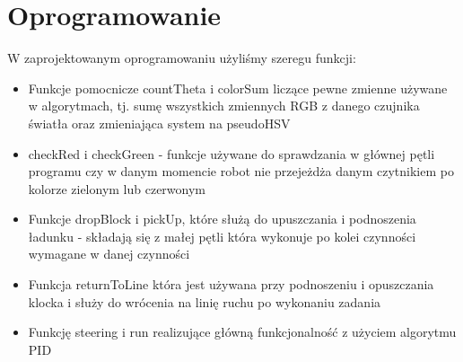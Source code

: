 \documentclass[10pt,a4paper]{report}
\begin{document}
\section{Oprogramowanie}
W zaprojektowanym oprogramowaniu użyliśmy szeregu funkcji:
\begin{itemize}
\item
 Funkcje pomocnicze countTheta i colorSum liczące pewne zmienne używane w algorytmach, tj. sumę wszystkich zmiennych RGB z danego czujnika światła oraz zmieniająca system na pseudoHSV
 \item
 checkRed i checkGreen - funkcje używane do sprawdzania w głównej pętli programu czy w danym momencie robot nie przejeżdża danym czytnikiem po kolorze zielonym lub czerwonym
 \item
 Funkcje dropBlock i pickUp, które służą do upuszczania i podnoszenia ładunku - składają się z małej pętli która wykonuje po kolei czynności wymagane w danej czynności
 \item
 Funkcja returnToLine która jest używana przy podnoszeniu i opuszczania klocka i służy do wrócenia na linię ruchu po wykonaniu zadania
 \item
 Funkcję steering i run realizujące główną funkcjonalność z użyciem algorytmu PID
\end{itemize}
\end{document}
